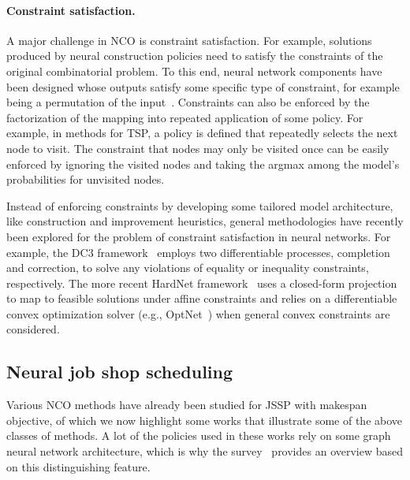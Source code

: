 \documentclass[a4paper]{report}
\theoremstyle{definition}
\theoremstyle{plain}
\begin{document}


\paragraph{Constraint satisfaction.}
A major challenge in NCO is constraint
satisfaction. For example, solutions produced by neural construction policies
need to satisfy the constraints of the original combinatorial problem.
To this
end, neural network components have been designed whose outputs satisfy some
specific type of constraint, for example being a permutation of the
input~\cite{vinyalsPointerNetworks2017a}. Constraints can also be enforced by
the factorization of the mapping into repeated application of some policy. For
example, in methods for TSP, a policy is defined that repeatedly selects the
next node to visit. The constraint that nodes may only be visited once can be
easily enforced by ignoring the visited nodes and taking the argmax among the
model's probabilities for unvisited nodes.


Instead of enforcing constraints by developing some tailored model architecture,
like construction and improvement heuristics, general methodologies have
recently been explored for the problem of constraint satisfaction in neural
networks. For example, the DC3 framework~\cite{dontiDC3LearningMethod2021}
employs two differentiable processes, completion and correction, to solve any
violations of equality or inequality constraints, respectively. The more recent
HardNet framework~\cite{minHardConstrainedNeuralNetworks2024} uses a closed-form
projection to map to feasible solutions under affine constraints and relies on a
differentiable convex optimization solver (e.g.,
OptNet~\cite{amosOptNetDifferentiableOptimization2021}) when general convex
constraints are considered.

\subsection{Neural job shop scheduling}

Various NCO methods have already been studied for JSSP with makespan objective,
of which we now highlight some works that illustrate some of the above classes
of methods. A lot of the policies used in these works rely on some graph neural
network architecture, which is why the survey~\cite{smitGraphNeuralNetworks2024}
provides an overview based on this distinguishing feature.
\end{document}
